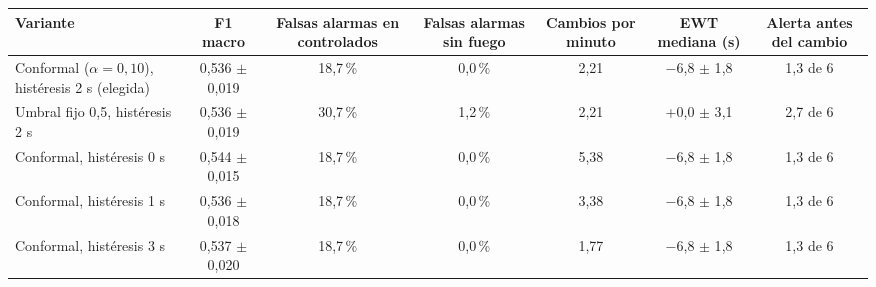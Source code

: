 \begin{tabular}{|l|c|c|c|c|c|c|}
\hline
\textbf{Variante} & \textbf{F1 macro} & \textbf{Falsas alarmas en controlados} & \textbf{Falsas alarmas sin fuego} & \textbf{Cambios por minuto} & \textbf{EWT mediana (s)} & \textbf{Alerta antes del cambio} \\ \hline
Conformal ($\alpha = 0{,}10$), histéresis 2 s (elegida) & 0{,}536 $\pm$ 0{,}019 & 18{,}7\,\% & 0{,}0\,\% & 2{,}21 & $-$6{,}8 $\pm$ 1{,}8 & 1{,}3 de 6 \\ \hline
Umbral fijo 0{,}5, histéresis 2 s & 0{,}536 $\pm$ 0{,}019 & 30{,}7\,\% & 1{,}2\,\% & 2{,}21 & +0{,}0 $\pm$ 3{,}1 & 2{,}7 de 6 \\ \hline
Conformal, histéresis 0 s & 0{,}544 $\pm$ 0{,}015 & 18{,}7\,\% & 0{,}0\,\% & 5{,}38 & $-$6{,}8 $\pm$ 1{,}8 & 1{,}3 de 6 \\ \hline
Conformal, histéresis 1 s & 0{,}536 $\pm$ 0{,}018 & 18{,}7\,\% & 0{,}0\,\% & 3{,}38 & $-$6{,}8 $\pm$ 1{,}8 & 1{,}3 de 6 \\ \hline
Conformal, histéresis 3 s & 0{,}537 $\pm$ 0{,}020 & 18{,}7\,\% & 0{,}0\,\% & 1{,}77 & $-$6{,}8 $\pm$ 1{,}8 & 1{,}3 de 6 \\ \hline
\end{tabular}

